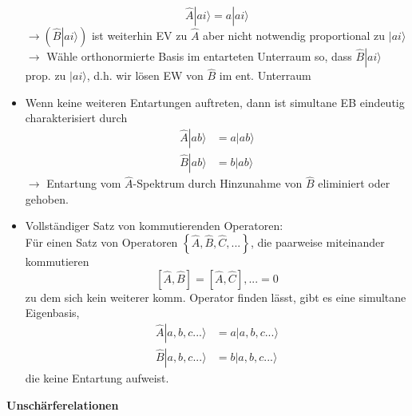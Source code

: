 \documentclass[10pt,article,colorback,accentcolor=tud9d]{scrartcl}
\begin{document}
\begin{itemize}
      \begin{equation}
      \hat{A}\left.\right|ai\rangle =a\left.\right|ai\rangle
      \end{equation}
      $\rightarrow \left(\hat{B}\left.\right|ai\rangle\right)$ ist weiterhin EV zu $\hat{A}$ aber nicht notwendig proportional zu $\left.\right|ai\rangle$\\
      $\rightarrow$ Wähle orthonormierte Basis im entarteten Unterraum so, dass $\hat{B}\left.\right|ai\rangle$ prop. zu $\left.\right|ai\rangle$, d.h. wir lösen EW von $\hat{B}$ im ent. Unterraum
    \item Wenn keine weiteren Entartungen auftreten, dann ist simultane EB eindeutig charakterisiert durch 
      \begin{equation}
      \begin{aligned}
        \hat{A}\left.\right|ab\rangle&=a\left.\right|ab\rangle\\
        \hat{B}\left.\right|ab\rangle&=b\left.\right|ab\rangle
      \end{aligned}
      \end{equation}
      $\rightarrow$ Entartung vom $\hat{A}$-Spektrum durch Hinzunahme von $\hat{B}$ eliminiert oder gehoben.
    \item Vollständiger Satz von kommutierenden Operatoren:\\
      Für einen Satz von Operatoren $\left\{\hat{A},\hat{B},\hat{C},...\right\}$, die paarweise miteinander kommutieren
      \begin{equation}
      \left[\hat{A},\hat{B}\right]=\left[\hat{A},\hat{C}\right],...=0
      \end{equation}
      zu dem sich kein weiterer komm. Operator finden lässt, gibt es eine simultane Eigenbasis, 
      \begin{equation}
      \begin{aligned}
        \hat{A}\left.\right|a,b,c...\rangle&=a\left.\right|a,b,c...\rangle\\
        \hat{B}\left.\right|a,b,c...\rangle&=b\left.\right|a,b,c...\rangle
      \end{aligned}
      \end{equation}
      die keine Entartung aufweist.
  \end{itemize}
\textbf{Unschärferelationen}
\end{document}
